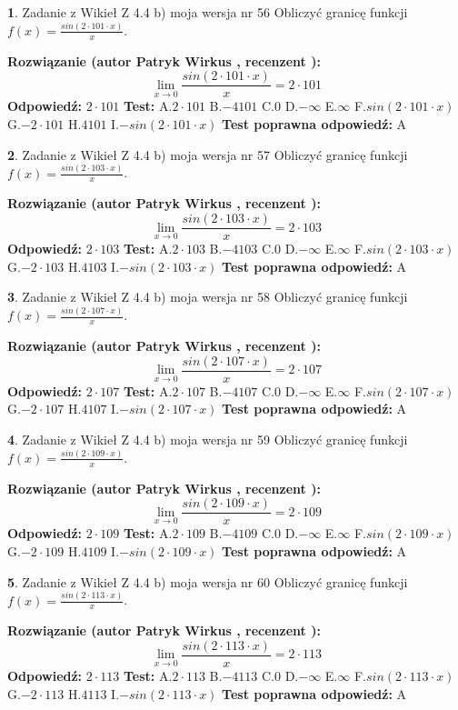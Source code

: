 \documentclass[12pt, a4paper]{article}
\theoremstyle{definition} %
\newtheorem{zad}{}
\newcommand{\zadStart}[1]{\begin{zad}#1\newline}
\newcommand{\zadStop}{\end{zad}}
\newcommand{\rozwStart}[2]{\noindent \textbf{Rozwiązanie (autor #1 , recenzent #2): }\newline}
\newcommand{\rozwStop}{\newline}
\newcommand{\odpStart}{\noindent \textbf{Odpowiedź:}\newline}
\newcommand{\odpStop}{\newline}
\newcommand{\testStart}{\noindent \textbf{Test:}\newline}
\newcommand{\testStop}{\newline}
\newcommand{\kluczStart}{\noindent \textbf{Test poprawna odpowiedź:}\newline}
\newcommand{\kluczStop}{\newline}
\begin{document}
\zadStart{Zadanie z Wikieł Z 4.4 b) moja wersja nr 56}
Obliczyć granicę funkcji $f(x)=\frac{sin(2 \cdot101\cdot x)}{x}$.
\zadStop
\rozwStart{Patryk Wirkus}{}
$$\lim\limits_{x\to 0}\frac{sin(2 \cdot 101\cdot x)}{x}=
2 \cdot 101$$
\rozwStop
\odpStart
$2 \cdot 101$
\odpStop
\testStart
A.$2 \cdot 101$
B.$-4101$
C.$0$
D.$-\infty$
E.$\infty$
F.$sin(2 \cdot 101\cdot x)$
G.$-2 \cdot 101$
H.$4101$
I.$-sin(2 \cdot 101\cdot x)$
\testStop
\kluczStart
A
\kluczStop



\zadStart{Zadanie z Wikieł Z 4.4 b) moja wersja nr 57}
Obliczyć granicę funkcji $f(x)=\frac{sin(2 \cdot103\cdot x)}{x}$.
\zadStop
\rozwStart{Patryk Wirkus}{}
$$\lim\limits_{x\to 0}\frac{sin(2 \cdot 103\cdot x)}{x}=
2 \cdot 103$$
\rozwStop
\odpStart
$2 \cdot 103$
\odpStop
\testStart
A.$2 \cdot 103$
B.$-4103$
C.$0$
D.$-\infty$
E.$\infty$
F.$sin(2 \cdot 103\cdot x)$
G.$-2 \cdot 103$
H.$4103$
I.$-sin(2 \cdot 103\cdot x)$
\testStop
\kluczStart
A
\kluczStop



\zadStart{Zadanie z Wikieł Z 4.4 b) moja wersja nr 58}
Obliczyć granicę funkcji $f(x)=\frac{sin(2 \cdot107\cdot x)}{x}$.
\zadStop
\rozwStart{Patryk Wirkus}{}
$$\lim\limits_{x\to 0}\frac{sin(2 \cdot 107\cdot x)}{x}=
2 \cdot 107$$
\rozwStop
\odpStart
$2 \cdot 107$
\odpStop
\testStart
A.$2 \cdot 107$
B.$-4107$
C.$0$
D.$-\infty$
E.$\infty$
F.$sin(2 \cdot 107\cdot x)$
G.$-2 \cdot 107$
H.$4107$
I.$-sin(2 \cdot 107\cdot x)$
\testStop
\kluczStart
A
\kluczStop



\zadStart{Zadanie z Wikieł Z 4.4 b) moja wersja nr 59}
Obliczyć granicę funkcji $f(x)=\frac{sin(2 \cdot109\cdot x)}{x}$.
\zadStop
\rozwStart{Patryk Wirkus}{}
$$\lim\limits_{x\to 0}\frac{sin(2 \cdot 109\cdot x)}{x}=
2 \cdot 109$$
\rozwStop
\odpStart
$2 \cdot 109$
\odpStop
\testStart
A.$2 \cdot 109$
B.$-4109$
C.$0$
D.$-\infty$
E.$\infty$
F.$sin(2 \cdot 109\cdot x)$
G.$-2 \cdot 109$
H.$4109$
I.$-sin(2 \cdot 109\cdot x)$
\testStop
\kluczStart
A
\kluczStop



\zadStart{Zadanie z Wikieł Z 4.4 b) moja wersja nr 60}
Obliczyć granicę funkcji $f(x)=\frac{sin(2 \cdot113\cdot x)}{x}$.
\zadStop
\rozwStart{Patryk Wirkus}{}
$$\lim\limits_{x\to 0}\frac{sin(2 \cdot 113\cdot x)}{x}=
2 \cdot 113$$
\rozwStop
\odpStart
$2 \cdot 113$
\odpStop
\testStart
A.$2 \cdot 113$
B.$-4113$
C.$0$
D.$-\infty$
E.$\infty$
F.$sin(2 \cdot 113\cdot x)$
G.$-2 \cdot 113$
H.$4113$
I.$-sin(2 \cdot 113\cdot x)$
\testStop
\kluczStart
A
\kluczStop
\end{document}

